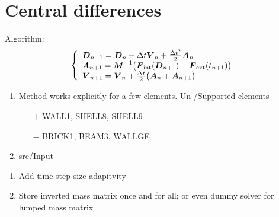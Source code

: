 \section{Central differences}
Algorithm:
\begin{gather*}
  \left\{\begin{array}{l}
     \boldsymbol{D}_{n+1} = \boldsymbol{D}_n + \Delta t \boldsymbol{V}_n + \frac{\Delta t^2}{2} \boldsymbol{A}_n
  \\
     \boldsymbol{A}_{n+1} = \boldsymbol{M}^{-1} \big( 
                     \boldsymbol{F}_{\text{int}}(\boldsymbol{D}_{n+1}) 
                     - \boldsymbol{F}_{\text{ext}}(t_{n+1})
                     \big)
  \\
     \boldsymbol{V}_{n+1} 
               = \boldsymbol{V}_n + \frac{\Delta t}{2} \big( 
               \boldsymbol{A}_n + \boldsymbol{A}_{n+1} \big)
  \end{array}\right.
\end{gather*}
\begin{enumerate}
\item Method works explicitly for a few elements. Un-/Supported elements
  \begin{itemize}
  \item[$+$] WALL1, SHELL8, SHELL9
  \item[$-$] BRICK1, BEAM3, WALLGE
  \end{itemize}
\item src/Input 
\end{enumerate}

\begin{enumerate}
\item Add time step-size adapitvity
\item Store inverted mass matrix once and for all; or even dummy solver for
  lumped mass matrix
\end{enumerate}
